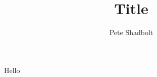 \documentclass[]{simple}
\title{Title}
\author{Pete Shadbolt}
\begin{document}
Hello
\end{document}
